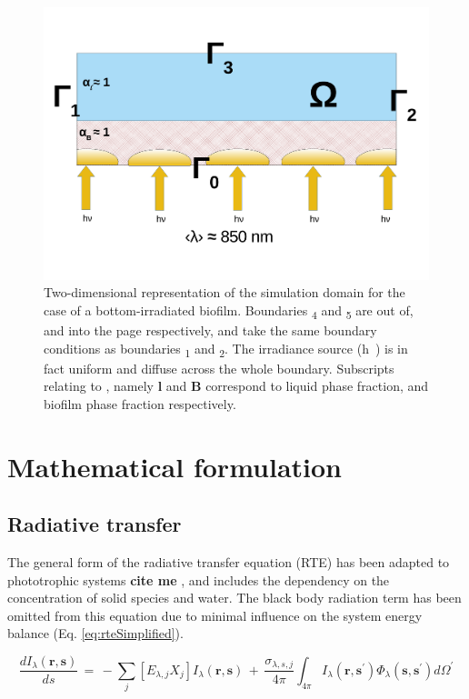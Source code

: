 \begin{figure}[htpb]
    \centering
    \includegraphics[scale=0.5]{Images/Chap4/prob_diagram_below.pdf}
    \caption{Two-dimensional representation of the simulation domain for the case of a bottom-irradiated biofilm. Boundaries \si{\Gamma_4} and \si{\Gamma_5} are out of, and into the page respectively, and take the same boundary conditions as boundaries \si{\Gamma_1} and \si{\Gamma_2}. The irradiance source (\si{h \nu}) is in fact uniform and diffuse across the whole boundary. Subscripts relating to \si{\alpha}, namely \textbf{l} and \textbf{B} correspond to liquid phase fraction, and biofilm phase fraction respectively.} 
    \label{fig:2d_above}
\end{figure}



\newpage
\section{Mathematical formulation}
\label{S:formulation}
\subsection{Radiative transfer}
The general form of the radiative transfer equation (RTE) has been adapted to phototrophic systems \textbf{cite me} \cite{kong2014}, and includes the dependency on the concentration of solid species and water. The black body radiation term has been omitted from this equation due to minimal influence on the system energy balance (Eq. \ref{eq:rteSimplified}). 

\begin{equation}
\frac{dI_\lambda (\textbf{r}, \textbf{s})}{ds} \, = \, - \sum_{j} [E_{\lambda,j} X_j] I_\lambda (\textbf{r}, \textbf{s})\, +\, \frac{\sigma_{\lambda, s, j}}{4 \pi} \int_{4 \pi} I_\lambda (\textbf{r}, \textbf{s}^\prime) \Phi_\lambda(\textbf{s}, \textbf{s}^\prime) d\Omega^\prime
    \end{equation}

